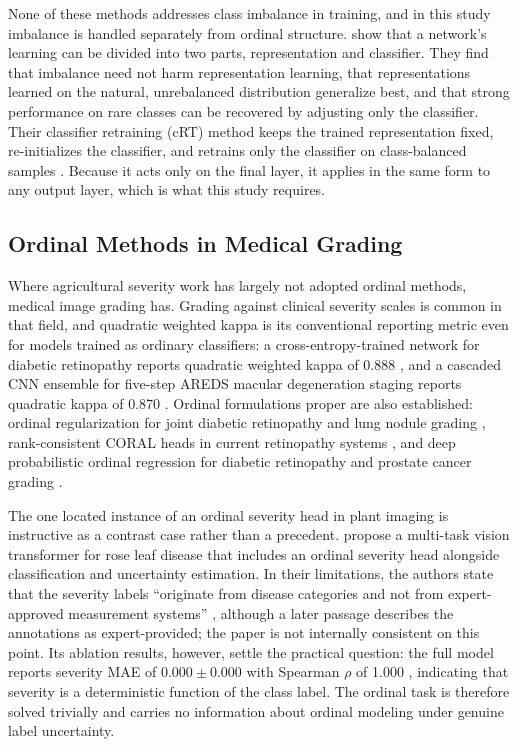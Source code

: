 \documentclass{icsthesis}
\begin{document}
\begin{mainmatter}
				None of these methods addresses class imbalance in training, and in this study
				imbalance is handled separately from ordinal structure. \citet{kang2020} show that a
				network's learning can be divided into two parts, representation and classifier.
				They find that imbalance need not harm representation learning, that representations
				learned on the natural, unrebalanced distribution generalize best, and that strong
				performance on rare classes can be recovered by adjusting only the classifier. Their
				classifier retraining (cRT) method keeps the trained representation fixed,
				re-initializes the classifier, and retrains only the classifier on class-balanced
				samples \citep{kang2020}. Because it acts only on the final layer, it applies in the
				same form to any output layer, which is what this study requires.

			\subsection{Ordinal Methods in Medical Grading}\label{sec:medical}

				Where agricultural severity work has largely not adopted ordinal methods, medical
				image grading has. Grading against clinical severity scales is common in that field,
				and quadratic weighted kappa is its conventional reporting metric even for models
				trained as ordinary classifiers: a cross-entropy-trained network for diabetic
				retinopathy reports quadratic weighted kappa of 0.888 \citep{farag2022}, and a
				cascaded CNN ensemble for five-step AREDS macular degeneration staging reports
				quadratic kappa of 0.870 \citep{xie2023}. Ordinal formulations proper are also
				established: ordinal regularization for joint diabetic retinopathy and lung nodule
				grading \citep{tang2023}, rank-consistent CORAL heads in current retinopathy systems
				\citep{braganca2026}, and deep probabilistic ordinal regression for diabetic
				retinopathy and prostate cancer grading \citep{toledo2022}.

				The one located instance of an ordinal severity head in plant imaging is instructive
				as a contrast case rather than a precedent. \citet{bohra2026} propose a multi-task
				vision transformer for rose leaf disease that includes an ordinal severity head
				alongside classification and uncertainty estimation. In their limitations, the
				authors state that the severity labels ``originate from disease categories and not
				from expert-approved measurement systems'' \citep{bohra2026}, although a later
				passage describes the annotations as expert-provided; the paper is not internally
				consistent on this point. Its ablation results, however, settle the practical
				question: the full model reports severity MAE of $0.000 \pm 0.000$ with Spearman
				$\rho$ of 1.000 \citep{bohra2026}, indicating that severity is a deterministic
				function of the class label. The ordinal task is therefore solved trivially and
				carries no information about ordinal modeling under genuine label uncertainty.


\end{mainmatter}
\end{document}

